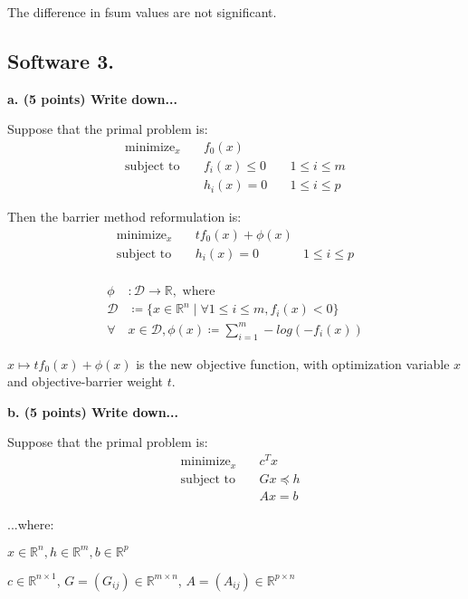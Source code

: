 \documentclass[a4paper,10pt]{article}
\theoremstyle{definition}
\begin{document}
The difference in fsum values are not significant.


\subsection*{Software 3. }

\textbf{a. (5 points) Write down...}

Suppose that the primal problem is:
\[
\begin{aligned}
    \text{minimize}_{x} \quad & f_0(x) \\
    \text{subject to} \quad & f_i(x) \leq 0 \quad & 1 \leq i \leq m\\
                            & h_i(x) = 0    \quad & 1 \leq i \leq p 
\end{aligned}
\]

Then the barrier method reformulation is: 
\[
\begin{aligned}
    \text{minimize}_{x} \quad & tf_0(x) + \phi(x)\\
    \text{subject to} \quad & h_i(x) = 0 \quad & 1 \leq i \leq p\\
\end{aligned}
\]

\[
\begin{aligned}
    \phi & : \mathcal{D} \rightarrow \mathbb{R}, \text{ where }\\
    \mathcal{D} & \coloneq \{x \in \mathbb{R} ^ n \mid \forall 1\leq i\leq m, f_i(x) < 0\}\\
    \forall & x \in \mathcal{D}, \phi(x) \coloneq \sum_{i=1}^{m} -log(-f_i(x))
\end{aligned}
\]

$x \mapsto tf_0(x) + \phi(x)$ is the new objective function,
with optimization variable $x$ and objective-barrier weight $t$.

\textbf{b. (5 points) Write down...}


Suppose that the primal problem is:
\[
\begin{aligned}
    & \text{minimize}_{x} \quad & c^Tx \\
    & \text{subject to} \quad & Gx \preceq h \\
    & \quad & Ax = b  
\end{aligned}
\]

...where:

$x \in \mathbb{R}^n, h \in \mathbb{R}^m, b \in \mathbb{R}^p$

$c \in \mathbb{R}^{n \times 1}$, $G = (G_{ij}) \in \mathbb{R}^{m \times n}$, $A = (A_{ij}) \in \mathbb{R}^{p \times n}$
\end{document}
